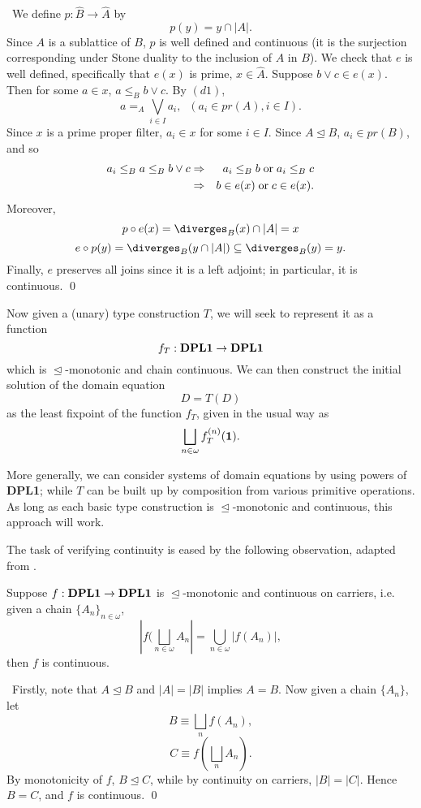 \proof\ We define $p : \hat{B} \rightarrow \hat{A}$ by
\[ p(y) = y \cap |A|. \]
Since $A$ is a sublattice of $B$, $p$ is well defined and continuous (it is the surjection corresponding under Stone duality to the inclusion of $A$ in $B$). We check that $e$ is well defined, specifically that $e(x)$ is prime, $x \in \hat{A}$. Suppose $b \vee c \in e(x)$. Then for some $a \in x$, $a \leq_{B} b \vee c$. By $(d1)$,
\[a =_{A} \bigvee_{i \in I}a_{i}, \;\; (a_{i} \in pr(A), i \in I). \]
Since $x$ is a prime proper filter, $a_{i} \in x$ for some $i \in I$. Since $A \trianglelefteq B$, $a_{i} \in pr(B)$, and so
\begin{eqnarray*}
a_{i} \leq_{B} a \leq_{B} b \vee c & \Rightarrow & a_{i} \leq_{B} b \;
{\rm or} \; a_{i} \leq_{B} c \\
& \Rightarrow & b \in e(x) \; {\rm or} \; c \in e(x).
\end{eqnarray*} 
Moreover,
\[p \circ e(x) = \diverges_{B}(x) \cap |A| = x \]
\[e \circ p(y) = \diverges_{B}(y \cap |A|) \subseteq \diverges_{B}(y) = y. \]
Finally, $e$ preserves all joins since it is a left adjoint; in particular, it is continuous. \qed

Now given a (unary) type construction $T$, we will seek to represent it as a function
\[f_{T} : {\bf DPL1} \rightarrow {\bf DPL1} \]
which is $\trianglelefteq$-monotonic and chain continuous. We can then construct the initial solution of the domain equation
\[D = T(D) \]
as the least fixpoint of the function $f_{T}$, given in the usual way as
\[\bigsqcup_{n \in \omega}f_{T}^{(n)}({\bf 1}). \]

More generally, we can consider systems of domain equations by using powers of {\bf DPL1}; while $T$ can be built up by composition from various primitive operations. As long as each basic type construction is $\trianglelefteq$-monotonic and continuous, this approach will work.

The task of verifying continuity is eased by the following observation, 
adapted from \cite{LW84}.
\begin{proposition}
Suppose $f : {\bf DPL1} \rightarrow {\bf DPL1}$ is $\trianglelefteq$-monotonic and continuous on carriers, i.e. given a chain
$\{A_{n}\}_{n \in \omega}$,
\[ |f(\bigsqcup_{n \in \omega}A_{n}| = \bigcup_{n \in \omega}|f(A_{n})|,\]
then $f$ is continuous.
\end{proposition}

\proof\ Firstly, note that $A \trianglelefteq B$ and $|A| = |B|$ implies $A = B$. Now given a chain $\{A_{n}\}$, let
\[B \equiv \bigsqcup_{n}f(A_{n}), \]
\[C \equiv f(\bigsqcup_{n}A_{n}). \]
By monotonicity of $f$, $B \trianglelefteq C$, while by continuity on carriers, $|B| = |C|$. Hence $B = C$, and $f$ is continuous. \qed
